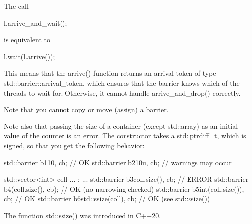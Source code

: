 The call

\begin{cpp}
l.arrive_and_wait();
\end{cpp}

is equivalent to

\begin{cpp}
l.wait(l.arrive());
\end{cpp}

This means that the arrive() function returns an arrival token of type std::barrier::arrival\_token, which ensures that the barrier knows which of the threads to wait for. Otherwise, it cannot handle arrive\_and\_drop() correctly.

Note that you cannot copy or move (assign) a barrier.

Note also that passing the size of a container (except std::array) as an initial value of the counter is an error. The constructor takes a std::ptrdiff\_t, which is signed, so that you get the following behavior:

\begin{cpp}
std::barrier b1{10, cb}; // OK
std::barrier b2{10u, cb}; // warnings may occur

std::vector<int> coll{ ... };
...
std::barrier b3{coll.size(), cb}; // ERROR
std::barrier b4(coll.size(), cb); // OK (no narrowing checked)
std::barrier b5{int(coll.size()), cb}; // OK
std::barrier b6{std::ssize(coll), cb}; // OK (see std::ssize())
\end{cpp}

The function std::ssize() was introduced in C++20.




